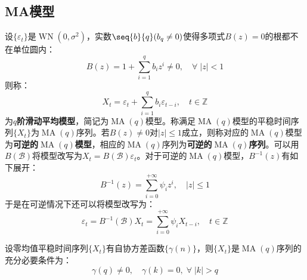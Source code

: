 \subsection{MA模型}
\begin{definition}
	设$\{\varepsilon_t\}$是$\operatorname{WN}(0,\sigma^2)$，实数$\seq{b}{q}(b_q\ne0)$使得多项式$B(z)=0$的根都不在单位圆内：
	\begin{equation*}
		B(z)=1+\sum_{i=1}^{q}b_iz^i\ne0,\quad\forall\;|z|<1
	\end{equation*}
	则称：
	\begin{equation*}
		X_t=\varepsilon_t+\sum_{i=1}^{q}b_i\varepsilon_{t-i},\quad t\in\mathbb{Z}
	\end{equation*}
	为\textbf{$q$阶滑动平均模型}，简记为$\operatorname{MA}(q)$模型。称满足$\operatorname{MA}(q)$模型的平稳时间序列$\{X_t\}$为$\operatorname{MA}(q)$序列。若$B(z)\ne0$对$|z|\leqslant1$成立，则称对应的$\operatorname{MA}(q)$模型为\textbf{可逆的$\operatorname{MA}(q)$模型}，相应的$\operatorname{MA}(q)$序列为\textbf{可逆的$\operatorname{MA}(q)$序列}。可以用$B(\mathcal{B})$将模型改写为$X_t=B(\mathcal{B})\varepsilon_t$。对于可逆的$\operatorname{MA}(q)$模型，$B^{-1}(z)$有如下展开：
	\begin{equation*}
		B^{-1}(z)=\sum_{i=0}^{+\infty}\psi_iz^i,\quad |z|\leqslant1
	\end{equation*}
	于是在可逆情况下还可以将模型改写为：
	\begin{equation*}
		\varepsilon_t=B^{-1}(\mathcal{B})X_t=\sum_{i=0}^{+\infty}\psi_iX_{t-i},\quad t\in\mathbb{Z}^{}
	\end{equation*}
\end{definition}
\begin{theorem}
	设零均值平稳时间序列$\{X_t\}$有自协方差函数$\{\gamma(n)\}$，则$\{X_t\}$是$\operatorname{MA}(q)$序列的充分必要条件为：
	\begin{equation*}
		\gamma(q)\ne 0,\quad\gamma(k)=0,\;\forall\;|k|>q
	\end{equation*}
\end{theorem}
